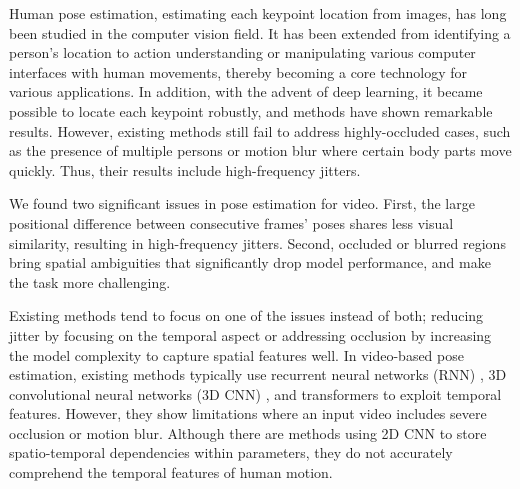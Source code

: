 \documentclass[10pt,twocolumn,letterpaper]{article}
\begin{document}
Human pose estimation, estimating each keypoint location from images, has long been studied in the computer vision field. It has been extended from identifying a person's location to action understanding \cite{actrecog_vi, htnet, tanfous2022and, ahmad2006human, roh2010view, roh2007accurate} or manipulating various computer interfaces with human movements, thereby becoming a core technology for various applications. In addition, with the advent of deep learning, it became possible to locate each keypoint robustly, and methods \cite{hrnet,fastpose,partaffinityfields,alphapose,alpha++,yang2007reconstruction,lee2021uncertainty} have shown remarkable results. However, existing methods still fail to address highly-occluded cases, such as the presence of multiple persons or motion blur where certain body parts move quickly. Thus, their results include high-frequency jitters.

We found two significant issues in pose estimation for video. First, the large positional difference between consecutive frames' poses shares less visual similarity, resulting in high-frequency jitters. Second, occluded or blurred regions bring spatial ambiguities that significantly drop model performance, and make the task more challenging. 

Existing methods \cite{lpm,3dspatiotemporal,deciwatch,transfusion,skeletor,dkd} tend to focus on one of the issues instead of both; reducing jitter by focusing on the temporal aspect or addressing occlusion by increasing the model complexity to capture spatial features well. In video-based pose estimation, existing methods typically use recurrent neural networks (RNN) \cite{lpm}, 3D convolutional neural networks (3D CNN) \cite{3dhrnet}, and transformers \cite{3dspatiotemporal,deciwatch,transfusion,skeletor} to exploit temporal features. However, they show limitations where an input video includes severe occlusion or motion blur. Although there are methods \cite{dcpose,posewarper,3dhrnet,dkd,margipose} using 2D CNN to store spatio-temporal dependencies within parameters, they do not accurately comprehend the temporal features of human motion.
\end{document}
